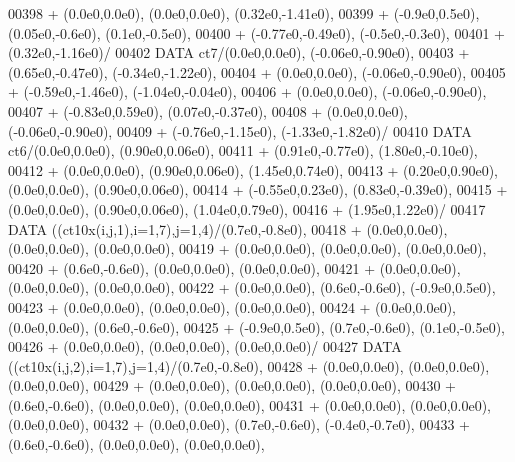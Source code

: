 \begin{DoxyCode}
00398      +                  (0.0e0,0.0e0), (0.0e0,0.0e0), (0.32e0,-1.41e0),
00399      +                  (-0.9e0,0.5e0), (0.05e0,-0.6e0), (0.1e0,-0.5e0),
00400      +                  (-0.77e0,-0.49e0), (-0.5e0,-0.3e0),
00401      +                  (0.32e0,-1.16e0)/
00402       \textcolor{keyword}{DATA}              ct7/(0.0e0,0.0e0), (-0.06e0,-0.90e0),
00403      +                  (0.65e0,-0.47e0), (-0.34e0,-1.22e0),
00404      +                  (0.0e0,0.0e0), (-0.06e0,-0.90e0),
00405      +                  (-0.59e0,-1.46e0), (-1.04e0,-0.04e0),
00406      +                  (0.0e0,0.0e0), (-0.06e0,-0.90e0),
00407      +                  (-0.83e0,0.59e0), (0.07e0,-0.37e0),
00408      +                  (0.0e0,0.0e0), (-0.06e0,-0.90e0),
00409      +                  (-0.76e0,-1.15e0), (-1.33e0,-1.82e0)/
00410       \textcolor{keyword}{DATA}              ct6/(0.0e0,0.0e0), (0.90e0,0.06e0),
00411      +                  (0.91e0,-0.77e0), (1.80e0,-0.10e0),
00412      +                  (0.0e0,0.0e0), (0.90e0,0.06e0), (1.45e0,0.74e0),
00413      +                  (0.20e0,0.90e0), (0.0e0,0.0e0), (0.90e0,0.06e0),
00414      +                  (-0.55e0,0.23e0), (0.83e0,-0.39e0),
00415      +                  (0.0e0,0.0e0), (0.90e0,0.06e0), (1.04e0,0.79e0),
00416      +                  (1.95e0,1.22e0)/
00417       \textcolor{keyword}{DATA}              ((ct10x(i,j,1),i=1,7),j=1,4)/(0.7e0,-0.8e0),
00418      +                  (0.0e0,0.0e0), (0.0e0,0.0e0), (0.0e0,0.0e0),
00419      +                  (0.0e0,0.0e0), (0.0e0,0.0e0), (0.0e0,0.0e0),
00420      +                  (0.6e0,-0.6e0), (0.0e0,0.0e0), (0.0e0,0.0e0),
00421      +                  (0.0e0,0.0e0), (0.0e0,0.0e0), (0.0e0,0.0e0),
00422      +                  (0.0e0,0.0e0), (0.6e0,-0.6e0), (-0.9e0,0.5e0),
00423      +                  (0.0e0,0.0e0), (0.0e0,0.0e0), (0.0e0,0.0e0),
00424      +                  (0.0e0,0.0e0), (0.0e0,0.0e0), (0.6e0,-0.6e0),
00425      +                  (-0.9e0,0.5e0), (0.7e0,-0.6e0), (0.1e0,-0.5e0),
00426      +                  (0.0e0,0.0e0), (0.0e0,0.0e0), (0.0e0,0.0e0)/
00427       \textcolor{keyword}{DATA}              ((ct10x(i,j,2),i=1,7),j=1,4)/(0.7e0,-0.8e0),
00428      +                  (0.0e0,0.0e0), (0.0e0,0.0e0), (0.0e0,0.0e0),
00429      +                  (0.0e0,0.0e0), (0.0e0,0.0e0), (0.0e0,0.0e0),
00430      +                  (0.6e0,-0.6e0), (0.0e0,0.0e0), (0.0e0,0.0e0),
00431      +                  (0.0e0,0.0e0), (0.0e0,0.0e0), (0.0e0,0.0e0),
00432      +                  (0.0e0,0.0e0), (0.7e0,-0.6e0), (-0.4e0,-0.7e0),
00433      +                  (0.6e0,-0.6e0), (0.0e0,0.0e0), (0.0e0,0.0e0),

\end{DoxyCode}
